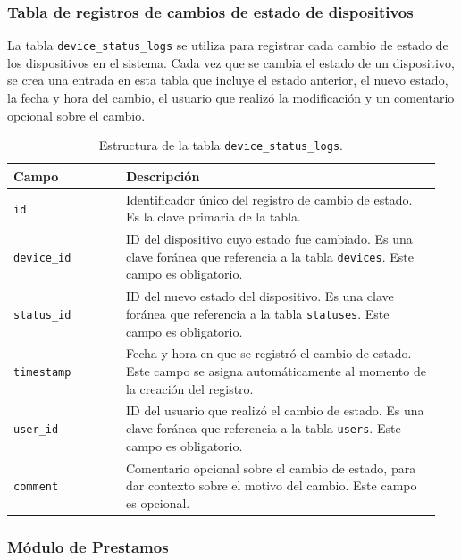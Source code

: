 \subsubsection*{Tabla de registros de cambios de estado de dispositivos}\label{sec:device_status_logs}

La tabla \texttt{device\_status\_logs} se utiliza para registrar cada cambio de estado de los dispositivos en el sistema. Cada vez que se cambia el estado de un dispositivo, se crea una entrada en esta tabla que incluye el estado anterior, el nuevo estado, la fecha y hora del cambio, el usuario que realizó la modificación y un comentario opcional sobre el cambio.

\begin{table}[H]
  \centering
  \begin{tabular}{|p{0.25\linewidth}|p{0.7\linewidth}|}
    \hline
    \textbf{Campo} & \textbf{Descripción} \\
    \hline
    \texttt{id} & Identificador único del registro de cambio de estado. Es la clave primaria de la tabla. \\
    \hline
    \texttt{device\_id} & ID del dispositivo cuyo estado fue cambiado. Es una clave foránea que referencia a la tabla \texttt{devices}. Este campo es obligatorio. \\
    \hline
    \texttt{status\_id} & ID del nuevo estado del dispositivo. Es una clave foránea que referencia a la tabla \texttt{statuses}. Este campo es obligatorio. \\
    \hline
    \texttt{timestamp} & Fecha y hora en que se registró el cambio de estado. Este campo se asigna automáticamente al momento de la creación del registro. \\
    \hline
    \texttt{user\_id} & ID del usuario que realizó el cambio de estado. Es una clave foránea que referencia a la tabla \texttt{users}. Este campo es obligatorio. \\
    \hline
    \texttt{comment} & Comentario opcional sobre el cambio de estado, para dar contexto sobre el motivo del cambio. Este campo es opcional. \\
    \hline
  \end{tabular}
  \caption{Estructura de la tabla \texttt{device\_status\_logs}.}
  \label{tab:tabla_device_status_logs}
\end{table}

\subsubsection{Módulo de Prestamos}\label{sec:modulo_prestamos}

